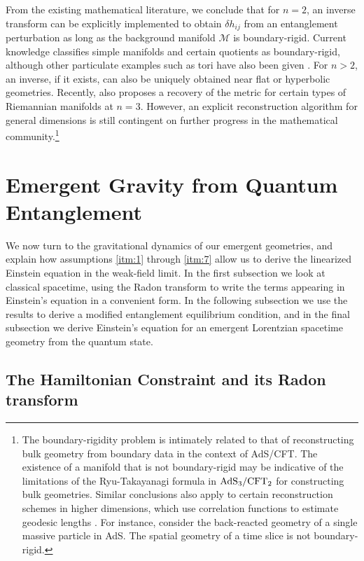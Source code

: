 \documentclass[%
preprint,
nofootinbib,
amsmath,amssymb,
aps,
prd,
showpacs,
superscriptaddress
]{revtex4-1}
\begin{document}
From the existing mathematical literature, we conclude that for $n=2$, an inverse transform can be explicitly implemented to obtain $\delta h_{ij}$ from an entanglement perturbation as long as the background manifold $\mathcal{M}$ is boundary-rigid. Current knowledge classifies simple manifolds and certain quotients  \cite{finitequotient} as boundary-rigid, although other particulate examples such as tori have also been given  \cite{Croke2004,torus2,croke1991}. For $n>2$, an inverse, if it exists, can also be uniquely obtained near flat or hyperbolic geometries. Recently, \cite{Tracey2017} also proposes a recovery of the metric for certain types of Riemannian manifolds at $n=3$. However, an explicit reconstruction algorithm for general dimensions is still contingent on further progress in the mathematical community.\footnote{The boundary-rigidity problem is intimately related to that of reconstructing bulk geometry from boundary data in the context of AdS/CFT. The existence of a manifold that is not boundary-rigid may be indicative of the limitations of the Ryu-Takayanagi formula in $\rm AdS_3/CFT_2$ for constructing bulk geometries. Similar conclusions also apply to certain reconstruction schemes in higher dimensions, which use correlation functions to estimate geodesic lengths  \cite{Porrati:2003na}. For instance, consider the back-reacted geometry of a single massive particle in AdS. The spatial geometry of a time slice is not boundary-rigid.} 



\section{Emergent Gravity from Quantum Entanglement}\label{sec:emergentgravity}

We now turn to the gravitational dynamics of our emergent geometries, and explain how assumptions \ref{itm:1} through \ref{itm:7} allow us to derive the linearized Einstein equation in the weak-field limit.
In the first subsection we look at classical spacetime, using the Radon transform to write the terms appearing in Einstein's equation in a convenient form.
In the following subsection we use the results to derive a modified entanglement equilibrium condition, and in the final
subsection we derive Einstein's equation for an emergent Lorentzian spacetime geometry from the quantum state.

\subsection{The Hamiltonian Constraint and its Radon transform}\label{subsec:MEECHamiltonianConstraint}
\end{document}
